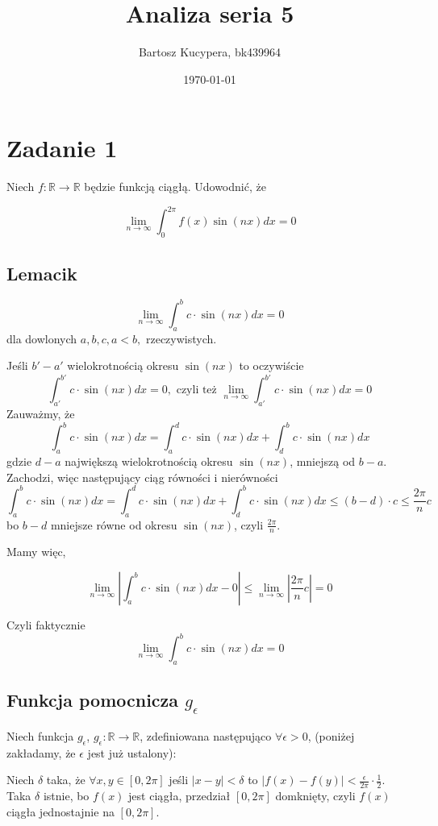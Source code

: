 \documentclass{article}
\title{Analiza seria 5}
\author{Bartosz Kucypera, bk439964}
\date{\today}
\begin{document}
\maketitle

\section*{Zadanie 1}

Niech $\displaystyle f : \mathbb{R} \to \mathbb{R} $ będzie funkcją ciągłą. Udowodnić, że

$$\lim_{n \to \infty} \int_{0}^{2\pi} f(x)\sin(nx)dx = 0$$

\subsection*{Lemacik}
$$\lim_{n\to \infty} \int_a^bc \cdot \sin(nx)dx = 0$$
dla dowlonych $a, b, c, a<b,$ rzeczywistych.

Jeśli $b' - a'$ wielokrotnością okresu $\sin(nx)$ to oczywiście
$$ \int_{a'}^{b'} c \cdot \sin(nx)dx = 0, \mbox{ czyli też } \lim_{n\to\infty}\int_{a'}^{b'}c \cdot \sin(nx)dx = 0$$
Zauważmy, że
$$\int_a^bc \cdot \sin(nx)dx = \int_{a}^{d} c \cdot \sin(nx)dx + \int_{d}^{b}c \cdot \sin(nx)dx $$
gdzie $d-a$ największą wielokrotnością okresu $\sin(nx)$, mniejszą od $b-a$.
Zachodzi, więc następujący ciąg równości i nierówności
$$\int_a^b c \cdot \sin(nx)dx = \int_a^d c \cdot \sin(nx)dx + \int_d^b c \cdot \sin(nx)dx \le (b-d)\cdot c \le \frac{2\pi}{n}c $$
bo $b-d$ mniejsze równe od okresu $\sin(nx)$, czyli $\frac{2\pi}{n}$. \newline

Mamy więc, 

$$\lim_{n\to \infty} \left| \int_a^bc\cdot\sin(nx)dx - 0 \right| \le
\lim_{n\to\infty} \left| \frac{2\pi}{n}c \right| = 0 $$

Czyli faktycznie 
$$\lim_{n\to\infty}\int_a^bc\cdot \sin(nx)dx = 0$$

\newpage

\subsection*{Funkcja pomocnicza $g_{\epsilon}$}


Niech funkcja $g_{\epsilon}$, $g_{\epsilon}: \mathbb{R} \to \mathbb{R}$, zdefiniowana następująco $\forall \epsilon >0$, (poniżej zakładamy, że $\epsilon$ jest już ustalony):

Niech $\delta$ taka, że $\forall x,y \in [0,2\pi]$ jeśli $|x-y| < \delta$ to $|f(x) - f(y)| < \frac{\epsilon}{2\pi} \cdot \frac{1}{2}$. Taka $\delta$ istnie, bo $f(x)$ jest ciągła, przedział
$[0, 2\pi]$ domknięty, czyli $f(x)$ ciągła jednostajnie na $[0, 2\pi]$.
\end{document}
